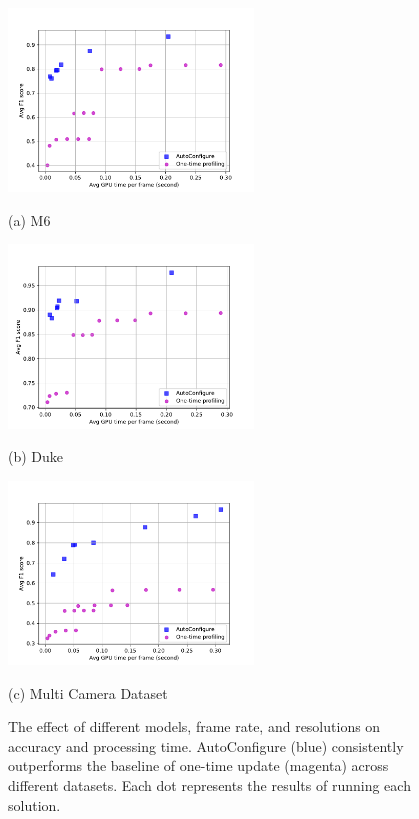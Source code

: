 \begin{figure}[!t]
		\begin{minipage}[t]{0.32\linewidth}
			\centerline{\includegraphics[width=6.5cm]{figures/m6.pdf}}
			\centerline{(a) M6}
		\end{minipage}
		\hfill
		\begin{minipage}[t]{0.32\linewidth}
			\centerline{\includegraphics[width=6.5cm]{figures/duke.pdf}}
			\centerline{(b) Duke}
		\end{minipage}
		\hfill
		\begin{minipage}[t]{0.32\linewidth}
			\centerline{\includegraphics[width=6.5cm]{figures/_Westbound_Eastbound_Rear.pdf}}
			\centerline{(c) Multi Camera Dataset}
		\end{minipage}		
		\caption{The effect of different models, frame rate, and resolutions on accuracy and processing time. AutoConfigure (blue) consistently outperforms the baseline of one-time update (magenta) across different datasets. Each dot represents the results of running each solution.}
		\label{fig_results}
\end{figure}